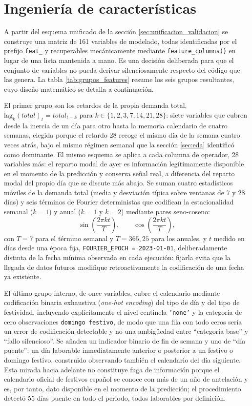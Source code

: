 \section{Ingeniería de características}\label{sec:ingenieria_features}

A partir del esquema unificado de la sección \ref{sec:unificacion_validacion} se
construye una matriz de 161 variables de modelado, todas identificadas por el prefijo
\texttt{feat\_} y recuperables mecánicamente mediante \texttt{feature\_columns()} en lugar
de una lista mantenida a mano. Es una decisión deliberada para que el conjunto de
variables no pueda derivar silenciosamente respecto del código que las genera. La tabla
\ref{tab:grupos_features} resume los seis grupos resultantes, cuyo diseño matemático se
detalla a continuación.

El primer grupo son los retardos de la propia demanda total,
$\text{lag}_k(\mathit{total})_t = \mathit{total}_{t-k}$ para
$k \in \{1, 2, 3, 7, 14, 21, 28\}$: siete variables que cubren desde la inercia de un día
para otro hasta la memoria calendario de cuatro semanas, elegida porque el retardo 28
recoge el mismo día de la semana cuatro veces atrás, bajo el mismo régimen semanal que la
sección \ref{sec:eda} identificó como dominante. El mismo esquema se aplica a cada columna
de operador, 28 variables más: el reparto modal de ayer es información legítimamente
disponible en el momento de la predicción y conserva señal real, a diferencia del reparto
modal del propio día que se discute más abajo. Se suman cuatro estadísticos móviles de la
demanda total (media y desviación típica sobre ventanas de 7 y 28 días) y seis términos de
Fourier deterministas que codifican la estacionalidad semanal ($k=1$) y anual ($k=1$ y
$k=2$) mediante pares seno-coseno:
\[
  \sin\!\left(\frac{2\pi k t}{T}\right), \qquad
  \cos\!\left(\frac{2\pi k t}{T}\right),
\]
con $T=7$ para el término semanal y $T=365{,}25$ para los anuales, y $t$ medido en días
desde una época fija, \texttt{FOURIER\_EPOCH = 2023-01-01}, deliberadamente distinta de la
fecha mínima observada en cada ejecución: fijarla evita que la llegada de datos futuros
modifique retroactivamente la codificación de una fecha ya existente.

El último grupo interno, de once variables, cubre el calendario mediante codificación
binaria exhaustiva (\emph{one-hot encoding}) del tipo de día y del tipo de festividad,
incluyendo explícitamente el nivel centinela \texttt{'none'} y la categoría de cero
observaciones \texttt{domingo festivo}, de modo que una fila con todo ceros sería un error
de codificación detectable y no una ambigüedad entre ``categoría base'' y ``fallo
silencioso''. Se añaden un indicador binario de fin de semana y uno de ``día puente'': un
día laborable inmediatamente anterior o posterior a un festivo o domingo festivo,
construido observando también el calendario del día siguiente. Esta mirada hacia adelante
no constituye fuga de información porque el calendario oficial de festivos español se
conoce con más de un año de antelación y es, por tanto, dato disponible en el momento de
la predicción; el procedimiento detectó 55 días puente en todo el periodo, todos
laborables por definición.

